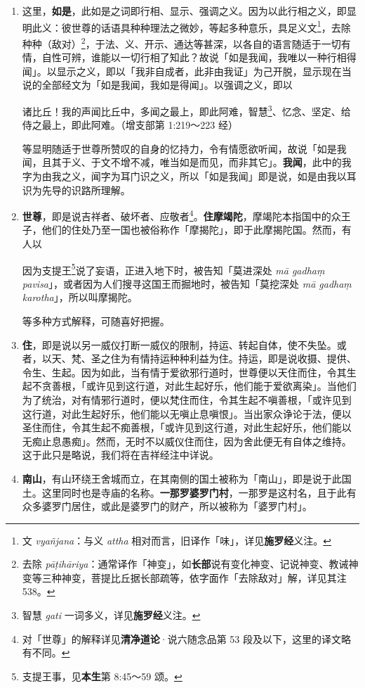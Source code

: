\begin{enumerate}
\item 这里，\textbf{如是}，此如是之词即行相、显示、强调之义。因为以此行相之义，即显明此义：彼世尊的话语具种种理法之微妙，等起多种意乐，具足义文\footnote{文 \textit{vyañjana}：与义 \textit{attha} 相对而言，旧译作「味」，详见\textbf{施罗经}义注。}，去除种种（敌对）\footnote{去除 \textit{pāṭihāriya}：通常译作「神变」，如\textbf{长部}说有变化神变、记说神变、教诫神变等三种神变，菩提比丘据长部疏等，依字面作「去除敌对」解，详见其注 538。}，于法、义、开示、通达等甚深，以各自的语言随适于一切有情，自性可辨，谁能以一切行相了知此？故说「如是我闻，我唯以一种行相得闻」。以显示之义，即以「我非自成者，此非由我证」为己开脱，显示现在当说的全部经文为「如是我闻，我如是得闻」。以强调之义，即以\begin{quoting}诸比丘！我的声闻比丘中，多闻之最上，即此阿难，智慧\footnote{智慧 \textit{gati} 一词多义，详见\textbf{施罗经}义注。}、忆念、坚定、给侍之最上，即此阿难。（增支部第 1:219～223 经）\end{quoting}等显明随适于世尊所赞叹的自身的忆持力，令有情愿欲听闻，故说「如是我闻，且其于义、于文不增不减，唯当如是而见，而非其它」。\textbf{我闻}，此中的我字为由我之义，闻字为耳门识之义，所以「如是我闻」即是说，如是由我以耳识为先导的识路所理解。
\item \textbf{世尊}，即是说吉祥者、破坏者、应敬者\footnote{对「世尊」的解释详见\textbf{清净道论}·说六随念品第 53 段及以下，这里的译文略有不同。}。\textbf{住摩竭陀}，摩竭陀本指国中的众王子，他们的住处乃至一国也被俗称作「摩揭陀」，即于此摩揭陀国。然而，有人以\begin{quoting}因为支提王\footnote{支提王事，见\textbf{本生}第 8:45～59 颂。}说了妄语，正进入地下时，被告知「莫进深处 \textit{mā gadhaṃ pavisa}」，或者因为人们搜寻这国王而掘地时，被告知「莫挖深处 \textit{mā gadhaṃ karotha}」，所以叫摩揭陀。\end{quoting}等多种方式解释，可随喜好把握。
\item \textbf{住}，即是说以另一威仪打断一威仪的限制，持运、转起自体，使不失坠。或者，以天、梵、圣之住为有情持运种种利益为住。持运，即是说收摄、提供、令生、生起。因为如此，当有情于爱欲邪行道时，世尊便以天住而住，令其生起不贪善根，「或许见到这行道，对此生起好乐，他们能于爱欲离染」。当他们为了统治，对有情邪行道时，便以梵住而住，令其生起不嗔善根，「或许见到这行道，对此生起好乐，他们能以无嗔止息嗔恨」。当出家众诤论于法，便以圣住而住，令其生起不痴善根，「或许见到这行道，对此生起好乐，他们能以无痴止息愚痴」。然而，无时不以威仪住而住，因为舍此便无有自体之维持。这于此只是略说，我们将在吉祥经注中详说。
\item \textbf{南山}，有山环绕王舍城而立，在其南侧的国土被称为「南山」，即是说于此国土。这里同时也是寺庙的名称。\textbf{一那罗婆罗门村}，一那罗是这村名，且于此有众多婆罗门居住，或此是婆罗门的财产，所以被称为「婆罗门村」。\end{enumerate}


